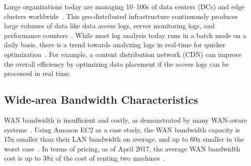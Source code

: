 
 Large organizations today are managing
10--100s of data centers (DCs) and edge clusters
worldwide~\cite{calder2013mapping}. This geo-distributed infrastructure
continuously produces large volumes of data like data access logs, server
monitoring logs, and performance counters~\cite{pu2015low,
  alspaugh2014analyzing, vulimiri2015global}. While most log analysis today runs
in a batch mode on a daily basis, there is a trend towards analyzing logs in
real-time for quicker optimization~\cite{rabkin2014aggregation}. For example, a
content distribution network (CDN) can improve the overall efficiency by
optimizing data placement if the access logs can be processed in real time.



\subsection{Wide-area Bandwidth Characteristics}
\label{sec:wide-area-bandwidth}

WAN bandwidth is insufficient and costly, as demonstrated by many WAN-aware
systems~\cite{pu2015low, vulimiri2015global, vulimiri2015wananlytics,
  hsieh17gaia}. Using Amazon EC2 as a case study, the WAN bandwidth capacity is
15x smaller than their LAN bandwidth on average, and up to 60x smaller in the
worst case~\cite{hsieh17gaia}. In terms of pricing, as of April 2017, the
average WAN bandwidth cost is up to 38x of the cost of renting two
machines~\cite{amazon2017pricing}.


